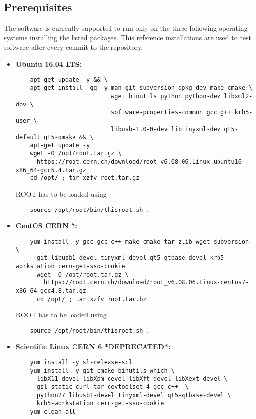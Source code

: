 \documentclass{article}
\begin{document}
\subsection{Prerequisites}
The software is currently supported to run only on the three following operating systems installing the listed packages. This reference installations are used to test software after every commit to the repository.
\begin{itemize}
\item \textbf{Ubuntu 16.04 LTS:}
  \begin{lstlisting}
    apt-get update -y && \
    apt-get install -qq -y man git subversion dpkg-dev make cmake \
                           wget binutils python python-dev libxml2-dev \
                           software-properties-common gcc g++ krb5-user \
                           libusb-1.0-0-dev libtinyxml-dev qt5-default qt5-qmake && \
    apt-get update -y
    wget -O /opt/root.tar.gz \
      https://root.cern.ch/download/root_v6.08.06.Linux-ubuntu16-x86_64-gcc5.4.tar.gz
    cd /opt/ ; tar xzfv root.tar.gz
  \end{lstlisting}
  ROOT has to be loaded using
  \begin{lstlisting}
    source /opt/root/bin/thisroot.sh .
  \end{lstlisting}
  \newpage
\item \textbf{CentOS CERN 7:}
  \begin{lstlisting}
    yum install -y gcc gcc-c++ make cmake tar zlib wget subversion \
      git libusb1-devel tinyxml-devel qt5-qtbase-devel krb5-workstation cern-get-sso-cookie
      wget -O /opt/root.tar.gz \
        https://root.cern.ch/download/root_v6.08.06.Linux-centos7-x86_64-gcc4.8.tar.gz
      cd /opt/ ; tar xzfv root.tar.bz
  \end{lstlisting}
  ROOT has to be loaded using
  \begin{lstlisting}
    source /opt/root/bin/thisroot.sh .
  \end{lstlisting}
\item \textbf{Scientific Linux CERN 6 *DEPRECATED*:}
  \begin{lstlisting}
    yum install -y sl-release-scl
    yum install -y git cmake binutils which \
      libX11-devel libXpm-devel libXft-devel libXext-devel \
      gsl-static curl tar devtoolset-4-gcc-c++  \
      python27 libusb1-devel tinyxml-devel qt5-qtbase-devel \
      krb5-workstation cern-get-sso-cookie
    yum clean all


\end{lstlisting}
\end{itemize}
\end{document}
